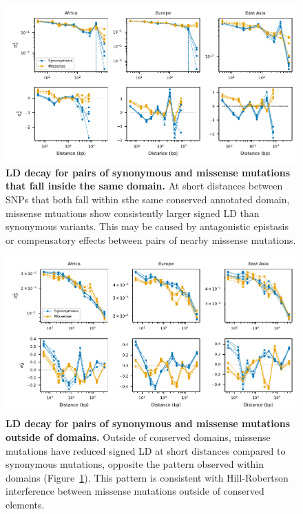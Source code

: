 \documentclass[]{article}
\begin{document}
\begin{figure}[ht!]
    \centering
    \includegraphics{../figures/ld_decay_in_domain}
    \caption{
        \textbf{LD decay for pairs of synonymous and missense mutations
        that fall inside the same domain.}
        At short distances between SNPs that both fall within sthe same conserved
        annotated domain, missense mtuations show consistently
        larger signed LD than synonymous variants. This may be caused by
        antagonistic epistasis or compensatory effects between pairs of
        nearby missense mutations.
    }
    \label{fig:LDwithin}
\end{figure}

\begin{figure}[ht!]
    \centering
    \includegraphics{../figures/ld_decay_outside_domains}
    \caption{
        \textbf{LD decay for pairs of synonymous and missense mutations
        outside of domains.}
        Outside of conserved domains,
        missense mutations have reduced signed LD at short distances
        compared to synonymous mutations,
        opposite the pattern observed within domains (Figure~\ref{fig:LDwithin}).
        This pattern is consistent with Hill-Robertson interference between
        missense mutations outside of conserved elements.
    }
    \label{fig:LDoutside}
\end{figure}
\end{document}
